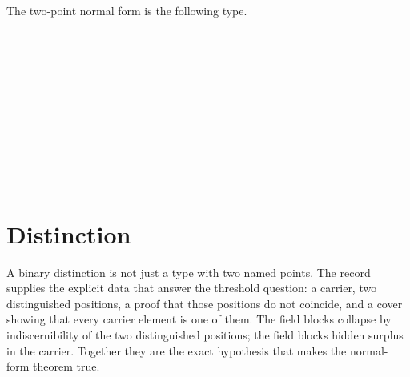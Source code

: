 \documentclass[11pt]{article}
\begin{document}
The two-point normal form is the following type.

\begin{code}%
\>[0]\<%
\\
\>[0]\AgdaSpace{}%
\AgdaSpace{}%
\AgdaSymbol{:}\AgdaSpace{}%
\AgdaSpace{}%
\<%
\\
\>[0][@{}l@{\AgdaIndent{0}}]%
\>[2]\AgdaSpace{}%
\AgdaSpace{}%
\AgdaSymbol{:}\AgdaSpace{}%
\<%
\\
%
\\[\AgdaEmptyExtraSkip]%
\>[0]\<%
\\
\>[0]\AgdaSpace{}%
\AgdaSymbol{:}\AgdaSpace{}%
\AgdaSpace{}%
\AgdaSymbol{(}\AgdaSpace{}%
\AgdaSpace{}%
\AgdaSymbol{)}\<%
\\
\>[0]\AgdaSpace{}%
\AgdaSymbol{()}\<%
\\
%
\\[\AgdaEmptyExtraSkip]%
\>[0]\<%
\\
\>[0]\AgdaSpace{}%
\AgdaSymbol{:}\AgdaSpace{}%
\AgdaSpace{}%
\AgdaSymbol{(}\AgdaSpace{}%
\AgdaSpace{}%
\AgdaSymbol{)}\<%
\\
\>[0]\AgdaSpace{}%
\AgdaSpace{}%
\AgdaSymbol{=}\AgdaSpace{}%
\AgdaSpace{}%
\AgdaSymbol{(}\AgdaSpace{}%
\AgdaSymbol{)}\<%
\end{code}

\section{Distinction}

A binary distinction is not just a type with two named points.  The
record supplies the explicit data that answer the threshold question:
a carrier, two distinguished positions, a proof that those positions do
not coincide, and a cover showing that every carrier element is one of
them.  The  field blocks collapse by
indiscernibility of the two distinguished positions; the
 field blocks hidden
surplus in the carrier.  Together they are the exact hypothesis that
makes the normal-form theorem true.
\end{document}
